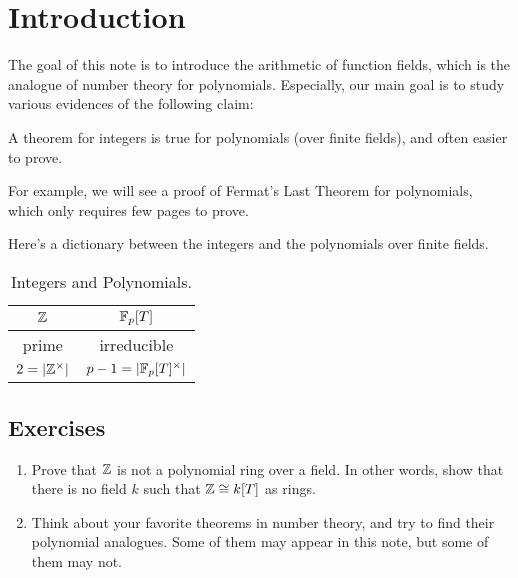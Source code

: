 \section{Introduction}
\label{sec:intro}

The goal of this note is to introduce the arithmetic of function fields, which is the analogue of number theory for polynomials.
Especially, our main goal is to study various evidences of the following claim:

\begin{myquote}
A theorem for integers is true for polynomials (over finite fields), and often easier to prove.
\end{myquote}
For example, we will see a proof of Fermat's Last Theorem for polynomials, which only requires few pages to prove.

Here's a dictionary between the integers and the polynomials over finite fields.
\begin{table}[h]
    \begin{center}
        \begin{tabular}{c|c}
            \toprule
            $\mathbb{Z}$ & $\mathbb{F}_p[T]$ \\
            \midrule
            prime & irreducible \\
            $2 = |\mathbb{Z}^\times|$ & $p - 1 = |\mathbb{F}_p[T]^\times|$ \\
            \bottomrule
        \end{tabular}
        \caption{Integers and Polynomials.}
        \label{tab:dictionary}
    \end{center}
\end{table}

\subsection*{Exercises}
\begin{enumerate}
    \item Prove that $\mathbb{Z}$ is not a polynomial ring over a field. In other words, show that there is no field $k$ such that $\mathbb{Z} \cong k[T]$ as rings.
    \item Think about your favorite theorems in number theory, and try to find their polynomial analogues. Some of them may appear in this note, but some of them may not.
\end{enumerate}
